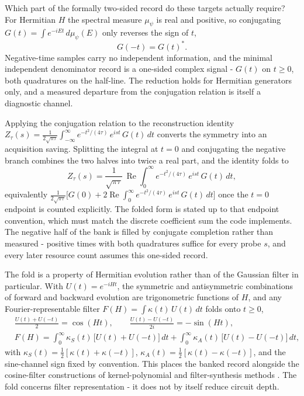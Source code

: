 Which part of the formally two-sided record do these targets actually require? For Hermitian $H$ the spectral measure $\mu_\psi$ is real and positive, so conjugating $G(t) = \int e^{-iEt}\,d\mu_\psi(E)$ only reverses the sign of $t$,
\begin{equation}\label{irf:hermitian-time-reflection}
G(-t) = G(t)^* .
\end{equation}
Negative-time samples carry no independent information, and the minimal independent denominator record is a one-sided complex signal - $G(t)$ on $t \ge 0$, both quadratures on the half-line. The reduction holds for Hermitian generators only, and a measured departure from the conjugation relation is itself a diagnostic channel.

Applying the conjugation relation to the reconstruction identity $Z_\tau(s) = \frac{1}{2\sqrt{\pi\tau}}\int_{-\infty}^{\infty} e^{-t^2/(4\tau)}\,e^{ist}\,G(t)\,dt$ converts the symmetry into an acquisition saving. Splitting the integral at $t = 0$ and conjugating the negative branch combines the two halves into twice a real part, and the identity folds to
\begin{equation}\label{res:one-sided-reconstruction}
Z_\tau(s) = \frac{1}{\sqrt{\pi\tau}}\,\operatorname{Re}\int_0^{\infty} e^{-t^2/(4\tau)}\,e^{ist}\,G(t)\,dt ,
\end{equation}
equivalently $\frac{1}{2\sqrt{\pi\tau}}\big[G(0) + 2\operatorname{Re}\int_0^{\infty} e^{-t^2/(4\tau)}\,e^{ist}\,G(t)\,dt\big]$ once the $t = 0$ endpoint is counted explicitly. The folded form is stated up to that endpoint convention, which must match the discrete coefficient sum the code implements. The negative half of the bank is filled by conjugate completion rather than measured - positive times with both quadratures suffice for every probe $s$, and every later resource count assumes this one-sided record.

The fold is a property of Hermitian evolution rather than of the Gaussian filter in particular. With $U(t) = e^{-iHt}$, the symmetric and antisymmetric combinations of forward and backward evolution are trigonometric functions of $H$, and any Fourier-representable filter $F(H) = \int \kappa(t)\,U(t)\,dt$ folds onto $t \ge 0$,
\begin{equation}\label{res:cosine-sine-filter-folding}
\begin{aligned}
&\frac{U(t)+U(-t)}{2} = \cos(Ht), \qquad \frac{U(t)-U(-t)}{2i} = -\sin(Ht),\\
&F(H) = \int_0^{\infty}\kappa_S(t)\,\big[U(t)+U(-t)\big]\,dt + \int_0^{\infty}\kappa_A(t)\,\big[U(t)-U(-t)\big]\,dt ,
\end{aligned}
\end{equation}
with $\kappa_S(t) = \frac{1}{2}[\kappa(t)+\kappa(-t)]$, $\kappa_A(t) = \frac{1}{2}[\kappa(t)-\kappa(-t)]$, and the sine-channel sign fixed by convention. This places the banked record alongside the cosine-filter constructions of kernel-polynomial and filter-synthesis methods \cite{weisse2006kpm, ge2019filter, dong2022qetu}. The fold concerns filter representation - it does not by itself reduce circuit depth.

